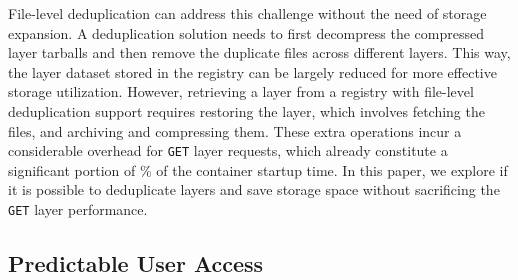 File-level deduplication can address this challenge without the need of storage expansion.
%
A deduplication solution needs to first decompress
the compressed layer tarballs and then remove the duplicate files across
different layers.
%
This way, the layer dataset stored in the registry can be largely reduced for more
effective storage utilization.
%
However, retrieving a layer from a registry with file-level
deduplication support requires restoring the layer,
which involves fetching the files, and archiving and compressing them.
%
These extra operations incur a considerable overhead for
\texttt{GET} layer requests, which already constitute a significant portion of \gap\% of
the container startup time.
%
In this paper, we explore if it is possible to deduplicate layers and save storage space
without sacrificing the \texttt{GET} layer performance.
%   


\subsection{Predictable User Access}
\label{sec:predictable-user-access}


